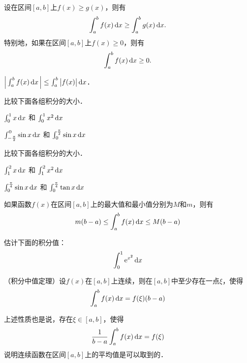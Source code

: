 \documentclass[14pt,notheorems,leqno,xcolor={rgb}]{beamer} %
\begin{document}
\begin{frame}
\begin{property}设在区间$[a,b]$上$f(x)\geq g(x)$，则有
\[ \int_a^b f(x)\mathop{}\!\mathrm{d} x \geq \int_a^b g(x)\mathop{}\!\mathrm{d} x.\]\pause
特别地，如果在区间$[a,b]$上$f(x)\geq 0$，则有
\[ \int_a^b f(x)\mathop{}\!\mathrm{d} x \geq 0.\]
\end{property}
\vpause
\begin{corollary*}
$\left|\,\int_a^b f(x)\mathop{}\!\mathrm{d} x\,\right| \le \int_a^b\big|f(x)\big|\mathop{}\!\mathrm{d} x$．
\end{corollary*}
\end{frame}

\begin{frame}
\begin{example}
比较下面各组积分的大小．
\begin{enumlite}
  \item $\int_0^1 x\mathop{}\!\mathrm{d} x$ 和 $\int_0^1 x^2 \mathop{}\!\mathrm{d} x$
  \item $\int_{-\frac\pi2}^0 \sin x \mathop{}\!\mathrm{d} x$ 和 $\int_0^{\frac\pi2}\sin x \mathop{}\!\mathrm{d} x$
\end{enumlite}
\end{example}\pause
\begin{exercise}
比较下面各组积分的大小．
\begin{enumlite}
  \item $\int_1^2 x\mathop{}\!\mathrm{d} x$ 和 $\int_1^2 x^2 \mathop{}\!\mathrm{d} x$\pause
  \item $\int_0^{\frac\pi4}\sin x\mathop{}\!\mathrm{d} x$ 和 $\int_0^{\frac\pi4}\tan x\mathop{}\!\mathrm{d} x$
\end{enumlite}
\end{exercise}
\end{frame}

\begin{frame}
\begin{property}
如果函数$f(x)$在区间$[a,b]$上的最大值和最小值分别为$M$和$m$，则有
\[ m(b-a) \leq \int_a^b f(x)\mathop{}\!\mathrm{d} x \leq M(b-a) \]
\end{property}\pause
\begin{example}
估计下面的积分值：
\[ \int_0^1 \mathrm{e}^{x^2} \mathop{}\!\mathrm{d} x \]
\end{example}
\end{frame}

\begin{frame}
\begin{property}
（积分中值定理）设$f(x)$在$[a,b]$上连续，则在$[a,b]$中至少存在一点$\xi$，使得
\[ \int_a^b f(x)\mathop{}\!\mathrm{d} x = f(\xi)(b-a) \]
\end{property}\pause
\begin{remark}上述性质也是说，存在$\xi\in[a,b]$，使得
\[ \frac1{b-a} \int_a^b f(x)\mathop{}\!\mathrm{d} x = f(\xi)\]
说明连续函数在区间$[a,b]$上的平均值是可以取到的．
\end{remark}
\end{frame}
\end{document}
